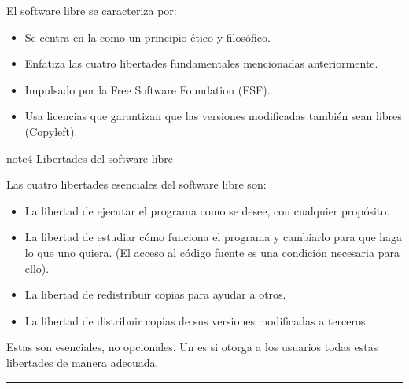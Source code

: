 \documentclass[letterpaper,10pt,spanish]{sphinxmanual}
\begin{document}
\sphinxAtStartPar
El software libre se caracteriza por:
\begin{itemize}
\item {} 
\sphinxAtStartPar
Se centra en la  como un principio ético y filosófico.

\item {} 
\sphinxAtStartPar
Enfatiza las cuatro libertades fundamentales mencionadas anteriormente.

\item {} 
\sphinxAtStartPar
Impulsado por la Free Software Foundation (FSF).

\item {} 
\sphinxAtStartPar
Usa licencias que garantizan que las versiones modificadas también sean libres (Copyleft).

\end{itemize}

\begin{sphinxadmonition}{note}{4 Libertades del software libre}

\sphinxAtStartPar
\sphinxfootnotemark[2] Las cuatro libertades esenciales del software libre son:
\begin{itemize}
\item {} 
\sphinxAtStartPar
{} La libertad de ejecutar el programa como se desee, con cualquier propósito.

\item {} 
\sphinxAtStartPar
{} La libertad de estudiar cómo funciona el programa y cambiarlo para que haga lo que uno quiera. (El acceso al código fuente es una condición necesaria para ello).

\item {} 
\sphinxAtStartPar
{} La libertad de redistribuir copias para ayudar a otros.

\item {} 
\sphinxAtStartPar
{} La libertad de distribuir copias de sus versiones modificadas a terceros.

\end{itemize}

\sphinxAtStartPar
Estas  son esenciales, no opcionales. Un  es  si otorga a los usuarios todas estas libertades de manera adecuada.
\end{sphinxadmonition}


\bigskip\hrule\bigskip
\end{document}
